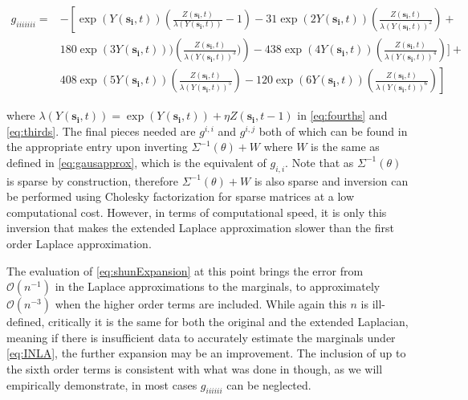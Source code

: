 \documentclass[11pt]{isuthesis}
\begin{document}
	\begin{align}
	g_{iiiiiii}=  &-\left[\exp(Y(\boldsymbol{s_i},t))\left(\frac{Z(\boldsymbol{s_i},t)}{\lambda(Y(\boldsymbol{s_i},t))}-1\right)-31\exp(2 Y(\boldsymbol{s_i},t))\left(\frac{Z(\boldsymbol{s_i},t)}{\lambda(Y(\boldsymbol{s_i},t))^2}\right)+\right. \nonumber \\
	& 180\exp(3Y(\boldsymbol{s_i},t)))\left(\frac{ Z(\boldsymbol{s_i},t)}{\lambda(Y(\boldsymbol{s_i},t))^3})\right)-438\exp(4Y(\boldsymbol{s_i},t))\left(\frac{ Z(\boldsymbol{s_i},t)}{\lambda(Y(\boldsymbol{s_i},t))^4}\right)]+\nonumber\\
	& \left. 408\exp(5Y(\boldsymbol{s_i},t))\left(\frac{ Z(\boldsymbol{s_i},t)}{\lambda(Y(\boldsymbol{s_i},t))^5}\right)-120\exp(6Y(\boldsymbol{s_i},t))\left(\frac{ Z(\boldsymbol{s_i},t)}{\lambda(Y(\boldsymbol{s_i},t))^6}\right)\right] \label{eq:sixths}
	\end{align}
	
	where $\lambda(Y(\boldsymbol{s_i},t))=\exp(Y(\boldsymbol{s_i},t))+\eta Z(\boldsymbol{s_i},t-1)$ in \eqref{eq:fourths} and \eqref{eq:thirds}.  The final pieces needed are $g^{i,i}$ and $g^{i,j}$ both of which can be found in the appropriate entry upon inverting $\Sigma^{-1}(\theta)+W$ where $W$ is the same as defined in \eqref{eq:gausapprox}, which is the equivalent of $g_{i,i}$.  Note that as $\Sigma^{-1}(\theta)$ is sparse by construction, therefore $\Sigma^{-1}(\theta)+W$ is also sparse and inversion can be performed using Cholesky factorization for sparse matrices at a low computational cost.  However, in terms of computational speed, it is only this inversion that makes the extended Laplace approximation slower than the first order Laplace approximation.
	
	The evaluation of \eqref{eq:shunExpansion} at this point brings the error from $\mathcal{O}(n^{-1})$ in the Laplace approximations to the marginals, to approximately $\mathcal{O}(n^{-3})$ when the higher order terms are included. While again this $n$ is ill-defined, critically it is the same for both the original and the extended Laplacian, meaning if there is insufficient data to accurately estimate the marginals under \eqref{eq:INLA}, the further expansion may be an improvement.  The inclusion of up to the sixth order terms is consistent with what was done in \cite{raudenbush2000maximum} though, as we will empirically demonstrate, in most cases $g_{iiiiii}$ can be neglected.
	
\end{document}
